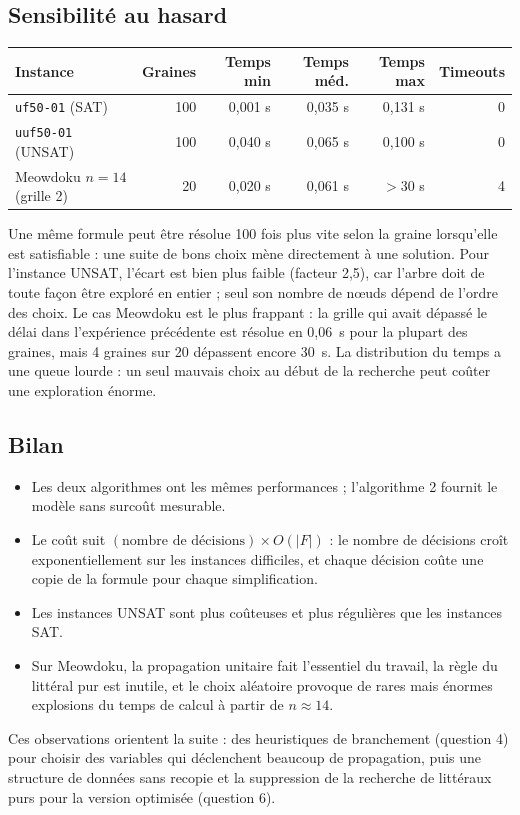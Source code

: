 \documentclass[11pt,a4paper]{article}
\begin{document}
\subsection{Sensibilité au hasard}

\begin{center}
\begin{tabular}{lrrrrr}
  Instance & Graines & Temps min & Temps méd. & Temps max & Timeouts \\
  \hline
  \texttt{uf50-01} (SAT)    & 100 & 0,001 s & 0,035 s & 0,131 s & 0 \\
  \texttt{uuf50-01} (UNSAT) & 100 & 0,040 s & 0,065 s & 0,100 s & 0 \\
  Meowdoku $n=14$ (grille 2) & 20 & 0,020 s & 0,061 s & $>30$ s & 4 \\
\end{tabular}
\end{center}

Une même formule peut être résolue 100 fois plus vite selon la graine
lorsqu'elle est satisfiable : une suite de bons choix mène directement à une
solution. Pour l'instance UNSAT, l'écart est bien plus faible (facteur 2,5),
car l'arbre doit de toute façon être exploré en entier ; seul son nombre de
n\oe{}uds dépend de l'ordre des choix. Le cas Meowdoku est le plus frappant :
la grille qui avait dépassé le délai dans l'expérience précédente est résolue
en 0,06~s pour la plupart des graines, mais 4 graines sur 20 dépassent
encore 30~s. La distribution du temps a une \og queue lourde \fg{} : un seul
mauvais choix au début de la recherche peut coûter une exploration énorme.

\subsection{Bilan}

\begin{itemize}
  \item Les deux algorithmes ont les mêmes performances ; l'algorithme 2
    fournit le modèle sans surcoût mesurable.
  \item Le coût suit $(\text{nombre de décisions}) \times O(|F|)$ : le
    nombre de décisions croît exponentiellement sur les instances
    difficiles, et chaque décision coûte une copie de la formule pour chaque
    simplification.
  \item Les instances UNSAT sont plus coûteuses et plus régulières que les
    instances SAT.
  \item Sur Meowdoku, la propagation unitaire fait l'essentiel du travail, la
    règle du littéral pur est inutile, et le choix aléatoire provoque de
    rares mais énormes explosions du temps de calcul à partir de $n\approx 14$.
\end{itemize}
Ces observations orientent la suite : des heuristiques de branchement
(question 4) pour choisir des variables qui déclenchent beaucoup de
propagation, puis une structure de données sans recopie et la suppression de
la recherche de littéraux purs pour la version optimisée (question 6).
\end{document}
